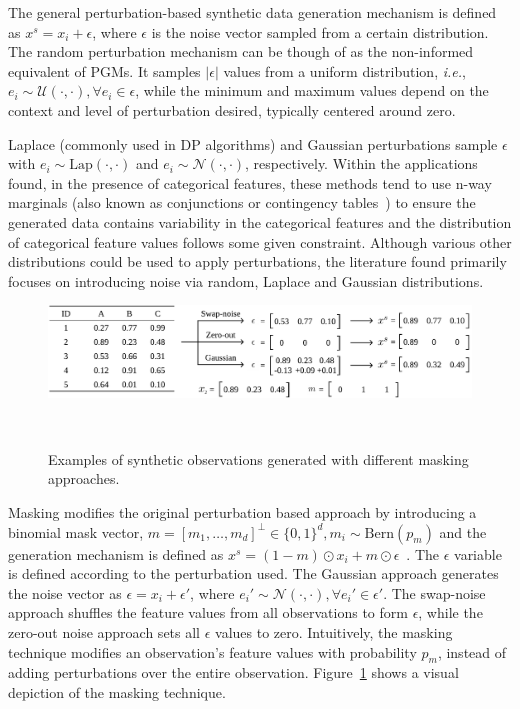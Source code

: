 \documentclass[parskip=full]{scrartcl}
\begin{document}
The general perturbation-based synthetic data generation mechanism is defined
as $x^s = x_i + \epsilon$, where $\epsilon$ is the noise vector sampled from a
certain distribution. The random perturbation mechanism can be though of as
the non-informed equivalent of PGMs. It samples $|\epsilon|$ values from a
uniform distribution, \textit{i.e.}, $e_i \sim \mathcal{U}(\cdot, \cdot),
\forall e_i \in \epsilon$, while the minimum and maximum values depend on the
context and level of perturbation desired, typically centered around zero.

Laplace (commonly used in DP algorithms) and Gaussian perturbations sample
$\epsilon$ with $e_i \sim \text{Lap}(\cdot, \cdot)$ and $e_i \sim
\mathcal{N}(\cdot, \cdot)$, respectively. Within the applications found, in
the presence of categorical features, these methods tend to use n-way
marginals (also known as conjunctions or contingency
tables~\cite{gaboardi2014dual}) to ensure the generated data contains
variability in the categorical features and the distribution of categorical
feature values follows some given constraint.  Although various other
distributions could be used to apply perturbations, the literature found
primarily focuses on introducing noise via random, Laplace and Gaussian
distributions.

\begin{figure}
	\centering
	\includegraphics[width=1\linewidth]{../analysis/masking-example}
    \caption{Examples of synthetic observations generated with different
        masking approaches.
    }~\label{fig:masking-example}
\end{figure}

Masking modifies the original perturbation based approach by introducing a
binomial mask vector, $m = [m_1, \ldots, m_d]^\bot \in \{0,1\}^d, m_i \sim
\text{Bern}(p_m)$ and the generation mechanism is defined as $x^s = (1 -
m)\odot x_i + m \odot \epsilon$~\cite{yoon2020vime}. The $\epsilon$ variable
is defined according to the perturbation used. The Gaussian approach generates
the noise vector as $\epsilon = x_i + \epsilon'$, where $e_i' \sim
\mathcal{N}(\cdot, \cdot), \forall e_i' \in \epsilon'$. The swap-noise
approach shuffles the feature values from all observations to form
$\epsilon$, while the zero-out noise approach sets all $\epsilon$ values to
zero. Intuitively, the masking technique modifies an observation's feature
values with probability $p_m$, instead of adding perturbations over the
entire observation. Figure~\ref{fig:masking-example} shows a visual depiction
of the masking technique.
\end{document}
